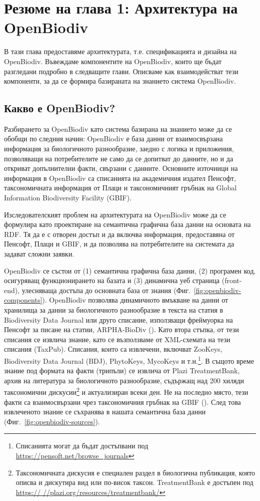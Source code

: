 \chapter{Резюме на глава 1: Архитектура на OpenBiodiv}
\label{chapter-openbiodiv}

В тази глава предоставяме архитектурата, т.е. спецификацията и дизайна на OpenBiodiv. Въвеждаме компонентите на OpenBiodiv, които ще бъдат разгледани подробно в следващите глави. Описваме как взаимодействат тези компоненти, за да се формира базираната на знанието система OpenBiodiv.

\section{Какво е OpenBiodiv?}

Разбирането за OpenBiodiv като система базирана на знанието може да се обобщи по следния начин: OpenBiodiv е база данни от взаимосвързана информация за биологичното разнообразие, заедно с логика и приложения, позволяващи на потребителите не само да се допитват до данните, но и да откриват допълнителни факти, свързани с данните. Основните източници на информация в OpenBiodiv са списанията на академичния издател Пенсофт, таксономичната информация от Плаци и таксономичният гръбнак на Global Information Biodiversity Facility (GBIF).

Изследователският проблем на архитектурата на OpenBiodiv може да се формулира като проектиране на семантична графична база данни на основата на RDF. Тя да е с отворен достъп и да включва информация, предоставяна от Пенсофт, Плаци и GBIF, и да позволява на потребителите на системата да задават сложни заявки.

OpenBiodiv се състои от (1) семантична графична база данни, (2) програмен код, осигуряващ функционирането на базата и (3) динамична уеб страница (front-end), улесняваща достъпа до основната база от знания (Фиг.~\ref{fig:openbiodiv-components}). OpenBiodiv позволява динамичното вмъкване на данни от хранилища за данни за биологичното разнообразие в текста на статия в Biodiversity Data Journal или друго списание, използващи фреймуорка на Пенсофт за писане на статии, ARPHA-BioDiv (\cite{penev_arpha-biodiv:_2017}). Като втора стъпка, от тези списания се извлича знание, като се възползваме от XML-схемата на тези списания (TaxPub). Списания, които са извлечени, включват ZooKeys, Biodiversity Data Journal (BDJ), PhytoKeys, MycoKeys и т.н.\footnote{Списанията могат да бъдат достъпвани под \url{https://pensoft.net/browse_journals}}. В същото време знание под формата на факти (трипъли) се извлича от Plazi TreatmentBank, архив на литература за биологичното разнообразие, съдържащ над 200 хиляди таксономични дискусии\footnote{Таксономичната дискусия е специален раздел в биологична публикация, която описва и дискутира вид или по-висок таксон. TreatmentBank е достъпен под \url{https:// //plazi.org/resources/treatmentbank/}} и актуализиран всеки ден. Не на последно място, тези факти са взаимосвързани чрез таксономичния гръбнак на GBIF (\cite{gbif_secretariat_gbif_2017}). След това извлеченото знание се съхранява в нашата семантична база данни  (Фиг.~\ref{fig:openbiodiv-sources}).

